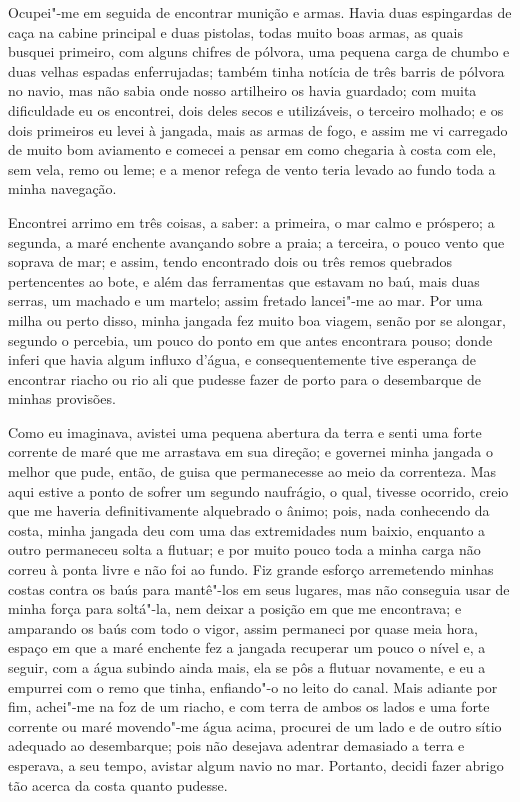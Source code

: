 Ocupei"-me em seguida de encontrar munição e armas. Havia duas
espingardas de caça na cabine principal e duas pistolas, todas muito
boas armas, as quais busquei primeiro, com alguns chifres de pólvora,
uma pequena carga de chumbo e duas velhas espadas enferrujadas; também
tinha notícia de três barris de pólvora no navio, mas não sabia onde
nosso artilheiro os havia guardado; com muita dificuldade eu os
encontrei, dois deles secos e utilizáveis, o terceiro molhado; e os dois
primeiros eu levei à jangada, mais as armas de fogo, e assim me vi
carregado de muito bom aviamento e comecei a pensar em como chegaria à
costa com ele, sem vela, remo ou leme; e a menor refega de vento teria
levado ao fundo toda a minha navegação.

Encontrei arrimo em três coisas, a saber: a primeira, o mar calmo e
próspero; a segunda, a maré enchente avançando sobre a praia; a
terceira, o pouco vento que soprava de mar; e assim, tendo encontrado
dois ou três remos quebrados pertencentes ao bote, e além das
ferramentas que estavam no baú, mais duas serras, um machado e um
martelo; assim fretado lancei"-me ao mar. Por uma milha ou perto disso,
minha jangada fez muito boa viagem, senão por se alongar, segundo o
percebia, um pouco do ponto em que antes encontrara pouso; donde inferi
que havia algum influxo d'água, e consequentemente tive esperança de
encontrar riacho ou rio ali que pudesse fazer de porto para o
desembarque de minhas provisões.

Como eu imaginava, avistei uma pequena abertura da terra e senti uma
forte corrente de maré que me arrastava em sua direção; e governei minha
jangada o melhor que pude, então, de guisa que permanecesse ao meio da
correnteza. Mas aqui estive a ponto de sofrer um segundo naufrágio, o
qual, tivesse ocorrido, creio que me haveria definitivamente alquebrado
o ânimo; pois, nada conhecendo da costa, minha jangada deu com uma das
extremidades num baixio, enquanto a outro permaneceu solta a flutuar; e
por muito pouco toda a minha carga não correu à ponta livre e não foi ao
fundo. Fiz grande esforço arremetendo minhas costas contra os baús para
mantê"-los em seus lugares, mas não conseguia usar de minha força para
soltá"-la, nem deixar a posição em que me encontrava; e amparando os baús
com todo o vigor, assim permaneci por quase meia hora, espaço em que a
maré enchente fez a jangada recuperar um pouco o nível e, a seguir, com
a água subindo ainda mais, ela se pôs a flutuar novamente, e eu a
empurrei com o remo que tinha, enfiando"-o no leito do canal. Mais
adiante por fim, achei"-me na foz de um riacho, e com terra de ambos os
lados e uma forte corrente ou maré movendo"-me água acima, procurei de um
lado e de outro sítio adequado ao desembarque; pois não desejava
adentrar demasiado a terra e esperava, a seu tempo, avistar algum navio
no mar. Portanto, decidi fazer abrigo tão acerca da costa quanto
pudesse.


